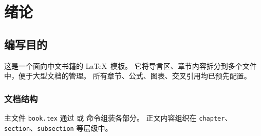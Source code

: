 \chapter{绪论}
\section{编写目的}
这是一个面向中文书籍的 \LaTeX\ 模板\cite{lamport94}。
它将导言区、章节内容拆分到多个文件中，便于大型文档的管理。
所有章节、公式、图表、交叉引用均已预先配置。

\subsection{文档结构}
主文件 \texttt{book.tex} 通过 \verb|| 或 \verb|| 命令组装各部分。
正文内容组织在 \texttt{chapter}、\texttt{section}、\texttt{subsection} 等层级中。